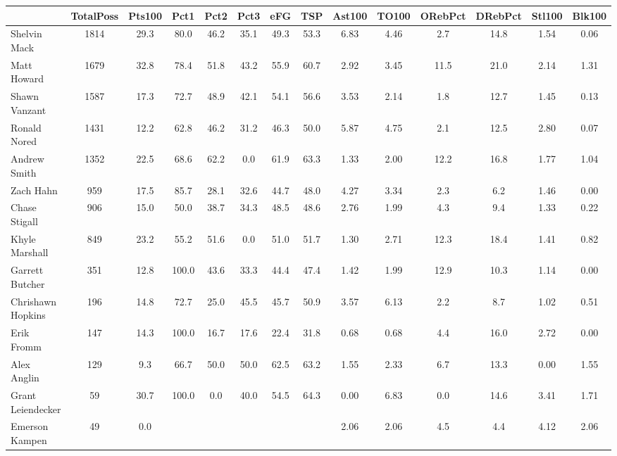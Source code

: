 \documentclass[10pt,letterpaper]{article}
\begin{document}
\begin{table}[ht]
\begin{center}
\begin{tabular}{lccccccccccccc}
  \hline
 & TotalPoss & Pts100 & Pct1 & Pct2 & Pct3 & eFG & TSP & Ast100 & TO100 & ORebPct & DRebPct & Stl100 & Blk100 \\ 
  \hline
Shelvin Mack & 1814 & 29.3 & 80.0 & 46.2 & 35.1 & 49.3 & 53.3 & 6.83 & 4.46 & 2.7 & 14.8 & 1.54 & 0.06 \\ 
  Matt Howard & 1679 & 32.8 & 78.4 & 51.8 & 43.2 & 55.9 & 60.7 & 2.92 & 3.45 & 11.5 & 21.0 & 2.14 & 1.31 \\ 
  Shawn Vanzant & 1587 & 17.3 & 72.7 & 48.9 & 42.1 & 54.1 & 56.6 & 3.53 & 2.14 & 1.8 & 12.7 & 1.45 & 0.13 \\ 
  Ronald Nored & 1431 & 12.2 & 62.8 & 46.2 & 31.2 & 46.3 & 50.0 & 5.87 & 4.75 & 2.1 & 12.5 & 2.80 & 0.07 \\ 
  Andrew Smith & 1352 & 22.5 & 68.6 & 62.2 & 0.0 & 61.9 & 63.3 & 1.33 & 2.00 & 12.2 & 16.8 & 1.77 & 1.04 \\ 
  Zach Hahn & 959 & 17.5 & 85.7 & 28.1 & 32.6 & 44.7 & 48.0 & 4.27 & 3.34 & 2.3 & 6.2 & 1.46 & 0.00 \\ 
  Chase Stigall & 906 & 15.0 & 50.0 & 38.7 & 34.3 & 48.5 & 48.6 & 2.76 & 1.99 & 4.3 & 9.4 & 1.33 & 0.22 \\ 
  Khyle Marshall & 849 & 23.2 & 55.2 & 51.6 & 0.0 & 51.0 & 51.7 & 1.30 & 2.71 & 12.3 & 18.4 & 1.41 & 0.82 \\ 
  Garrett Butcher & 351 & 12.8 & 100.0 & 43.6 & 33.3 & 44.4 & 47.4 & 1.42 & 1.99 & 12.9 & 10.3 & 1.14 & 0.00 \\ 
  Chrishawn Hopkins & 196 & 14.8 & 72.7 & 25.0 & 45.5 & 45.7 & 50.9 & 3.57 & 6.13 & 2.2 & 8.7 & 1.02 & 0.51 \\ 
  Erik Fromm & 147 & 14.3 & 100.0 & 16.7 & 17.6 & 22.4 & 31.8 & 0.68 & 0.68 & 4.4 & 16.0 & 2.72 & 0.00 \\ 
  Alex Anglin & 129 & 9.3 & 66.7 & 50.0 & 50.0 & 62.5 & 63.2 & 1.55 & 2.33 & 6.7 & 13.3 & 0.00 & 1.55 \\ 
  Grant Leiendecker & 59 & 30.7 & 100.0 & 0.0 & 40.0 & 54.5 & 64.3 & 0.00 & 6.83 & 0.0 & 14.6 & 3.41 & 1.71 \\ 
  Emerson Kampen & 49 & 0.0 &  &  &  &  &  & 2.06 & 2.06 & 4.5 & 4.4 & 4.12 & 2.06 \\ 
   \hline
\end{tabular}
\end{center}
\end{table}
\end{document}
